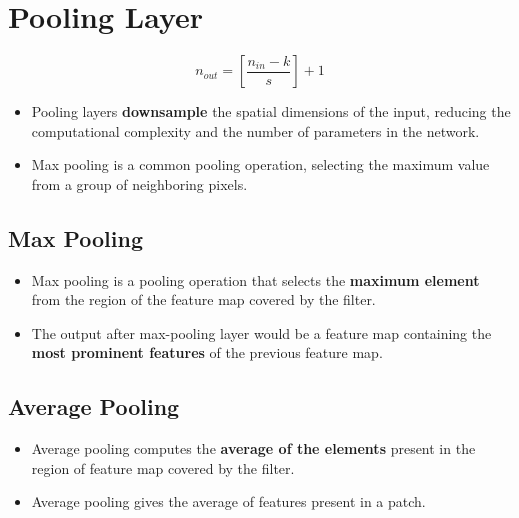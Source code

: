 
\section{Pooling Layer \cite{gfg-convolutional-neural-network-cnn-in-machine-learning}}\label{nn: Pooling Layer}

\[
   \displaystyle n_{out} = \left[ \frac{n_{in} - k}{s} \right] + 1
\]

\begin{itemize}
    \item Pooling layers \textbf{downsample} the spatial dimensions of the input, reducing the computational complexity and the number of parameters in the network. 
    
    \item Max pooling is a common pooling operation, selecting the maximum value from a group of neighboring pixels.

\end{itemize}


\subsection{Max Pooling \cite{gfg-cnn-introduction-to-pooling-layer}}\label{cnn: Max Pooling}

\begin{itemize}
    \item Max pooling is a pooling operation that selects the \textbf{maximum element} from the region of the feature map covered by the filter. 
    
    \item The output after max-pooling layer would be a feature map containing the \textbf{most prominent features} of the previous feature map.
\end{itemize}


\subsection{Average Pooling \cite{gfg-cnn-introduction-to-pooling-layer}}\label{cnn: Average Pooling}
\begin{itemize}
    \item Average pooling computes the \textbf{average of the elements} present in the region of feature map covered by the filter.
    
    \item Average pooling gives the average of features present in a patch.
\end{itemize}

